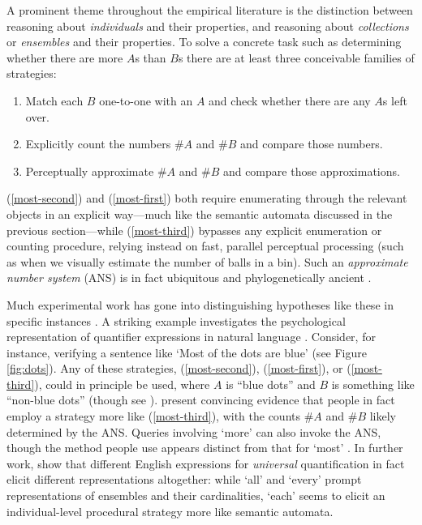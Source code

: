 \documentclass[12pt,oneside,reqno]{amsart}
\theoremstyle{definition}
\begin{document}
A prominent theme throughout the empirical literature is the distinction between reasoning about \emph{individuals} and their properties, and reasoning about \emph{collections} or \emph{ensembles} and their properties. To solve a concrete task such as determining whether there are more $A$s than $B$s there are at least three conceivable families of strategies: \begin{enumerate}
    \item \label{most-second} Match each $B$ one-to-one with an $A$ and check whether there are any $A$s left over.
    \item \label{most-first} Explicitly count the numbers $\#A$ and $\#B$ and compare those numbers.
    \item \label{most-third} Perceptually approximate  $\#A$ and $\#B$ and compare those approximations.
\end{enumerate} (\ref{most-second}) and (\ref{most-first}) both require enumerating through the relevant objects in an explicit way---much like the semantic automata discussed in the previous section---while (\ref{most-third}) bypasses any explicit enumeration or counting procedure, relying instead on fast, parallel perceptual processing (such as when we visually estimate the number of balls in a bin). Such an \emph{approximate number system} (ANS) is in fact ubiquitous and phylogenetically ancient \citep{Dehaene}. 


Much experimental work has gone into distinguishing hypotheses like these in specific instances \citep{carey2009origin}. A striking example investigates the psychological representation of quantifier expressions in natural language \citep{Pietroski,Lidz2011,Knowlton2,Knowlton}. Consider, for instance, verifying a sentence like `Most of the dots are blue' (see Figure \ref{fig:dots}). Any of these strategies, (\ref{most-second}), (\ref{most-first}), or (\ref{most-third}), could in principle be used, where $A$ is ``blue dots'' and $B$ is something like ``non-blue dots'' (though see \citealt{Lidz2011}). \cite{Pietroski} present convincing evidence that people in fact employ a strategy more like (\ref{most-third}), with the counts $\#A$ and $\#B$ likely determined by the  ANS. Queries involving `more' can also invoke the ANS, though the method people use appears distinct from that for `most' \citep{Knowlton2}. In  further work, \cite{Knowlton} show that different English expressions for \emph{universal} quantification in fact elicit  different representations altogether: while `all' and `every' prompt representations of ensembles and their cardinalities, `each' seems to elicit an individual-level procedural strategy more like  semantic automata. 
\end{document}
